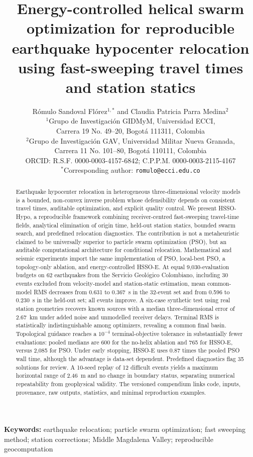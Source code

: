 \documentclass[10pt]{article}
\title{Energy-controlled helical swarm optimization for reproducible earthquake hypocenter relocation using fast-sweeping travel times and station statics}
\author{R\'omulo Sandoval Fl\'orez$^{1,*}$ and Claudia Patricia Parra Medina$^{2}$\\[0.4em]
\small $^{1}$Grupo de Investigaci\'on GIDMyM, Universidad ECCI,\\
\small Carrera 19 No. 49--20, Bogot\'a 111311, Colombia\\
\small $^{2}$Grupo de Investigaci\'on GAV, Universidad Militar Nueva Granada,\\
\small Carrera 11 No. 101--80, Bogot\'a 110111, Colombia\\
\small ORCID: R.S.F. 0000-0003-4157-6842; C.P.P.M. 0000-0003-2115-4167\\
\small $^{*}$Corresponding author: \texttt{romulo@ecci.edu.co}}
\date{}
\begin{document}
\doublespacing
\linenumbers
\maketitle

\begin{abstract}
Earthquake hypocenter relocation in heterogeneous three-dimensional velocity models is a bounded, non-convex inverse problem whose defensibility depends on consistent travel times, auditable optimization, and explicit quality control. We present HSSO-Hypo, a reproducible framework combining receiver-centred fast-sweeping travel-time fields, analytical elimination of origin time, held-out station statics, bounded swarm search, and predefined relocation diagnostics. The contribution is not a metaheuristic claimed to be universally superior to particle swarm optimization (PSO), but an auditable computational architecture for conditional relocation. Mathematical and seismic experiments import the same implementation of PSO, local-best PSO, a topology-only ablation, and energy-controlled HSSO-E. At equal 9,030-evaluation budgets on 62 earthquakes from the Servicio Geol\'ogico Colombiano, including 30 events excluded from velocity-model and station-static estimation, mean common-model RMS decreases from 0.631 to 0.367~s in the 32-event set and from 0.596 to 0.230~s in the held-out set; all events improve. A six-case synthetic test using real station geometries recovers known sources with a median three-dimensional error of 2.67~km under added noise and unmodelled receiver delays. Terminal RMS is statistically indistinguishable among optimizers, revealing a common final basin. Topological guidance reaches a $10^{-4}$ terminal-objective tolerance in substantially fewer evaluations: pooled medians are 600 for the no-helix ablation and 765 for HSSO-E, versus 2,085 for PSO. Under early stopping, HSSO-E uses 0.87 times the pooled PSO wall time, although the advantage is data-set dependent. Predefined diagnostics flag 35 solutions for review. A 10-seed replay of 12 difficult events yields a maximum horizontal range of 2.46~m and no change in boundary status, separating numerical repeatability from geophysical validity. The versioned compendium links code, inputs, provenance, raw outputs, statistics, and minimal reproduction examples.
\end{abstract}

\noindent\textbf{Keywords:} earthquake relocation; particle swarm optimization; fast sweeping method; station corrections; Middle Magdalena Valley; reproducible geocomputation
\end{document}
